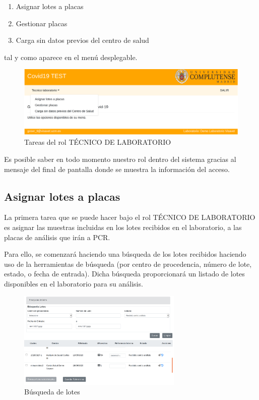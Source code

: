 \documentclass[a4paper,spanish]{paper}
\begin{document}
\begin{enumerate}
    \item Asignar lotes a placas
    \item Gestionar placas
    \item Carga sin datos previos del centro de salud
\end{enumerate}

tal y como aparece en el menú desplegable.

\begin{figure}[h]
\centering
\includegraphics[scale=0.6]{Figs/Fig14.png}
\caption{Tareas del rol TÉCNICO DE LABORATORIO}
\label{Fig14}
\end{figure}

\medskip
\begin{tcolorbox}[colback=blue!3!white,colframe=blue(ryb)!50!black,title=\textbf{Tip}]

Es posible saber en todo momento nuestro rol dentro del sistema gracias al mensaje del final de pantalla donde se muestra la información del acceso.

\end{tcolorbox}

\subsection{Asignar lotes a placas}

La primera tarea que se puede hacer bajo el rol TÉCNICO DE LABORATORIO es asignar las muestras incluidas en los lotes recibidos en el laboratorio, a las placas de análisis que irán a PCR.

Para ello, se comenzará haciendo una búsqueda de los lotes recibidos haciendo uso de la herramientas de búsqueda (por centro de procedencia, número de lote, estado, o fecha de entrada). Dicha búsqueda proporcionará un listado de lotes disponibles en el laboratorio para su análisis.

\begin{figure}[h]
\centering
\includegraphics[width=0.7\textwidth]{Figs/Fig15.png}
\caption{Búsqueda de lotes}
\label{Fig15}
\end{figure}
\end{document}
